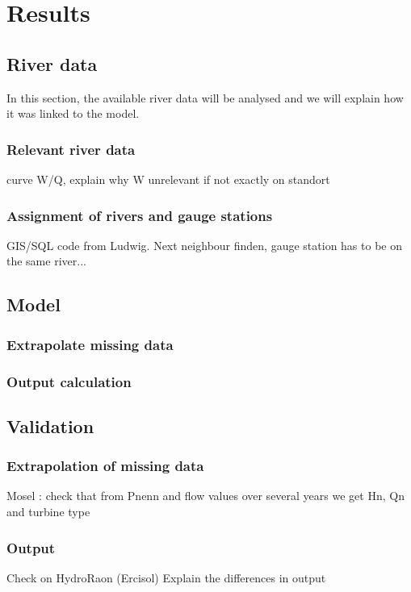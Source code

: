 \chapter{Results}

\section{River data}
In this section, the available river data will be analysed and we will explain how it was linked to the model.

\subsection{Relevant river data}
\label{rel_river_data}

curve W/Q, explain why W unrelevant if not exactly on standort
\subsection{Assignment of rivers and gauge stations}
\label{assign_rivers}
GIS/SQL code from Ludwig. Next neighbour finden, gauge station has to be on the same river...


\section{Model}

\subsection{Extrapolate missing data}
\subsection{Output calculation}

\section{Validation}
\subsection{Extrapolation of missing data}
\label{missing_data}
Mosel : check that from Pnenn and flow values over several years we get Hn, Qn and turbine type

\subsection{Output}
Check on HydroRaon (Ercisol) \newline
Explain the differences in output
